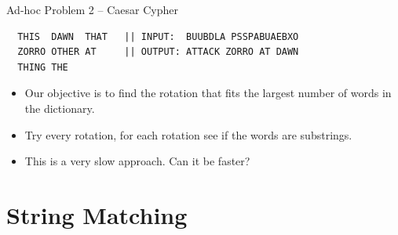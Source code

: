 \begin{frame}[fragile]{Ad-hoc Problem 2 -- Caesar Cypher}
\begin{verbatim}
  THIS  DAWN  THAT   || INPUT:  BUUBDLA PSSPABUAEBXO
  ZORRO OTHER AT     || OUTPUT: ATTACK ZORRO AT DAWN
  THING THE
\end{verbatim}

  \begin{itemize}
    \item Our objective is to find the rotation that fits the largest number of words in the dictionary.\bigskip

    \item Try every rotation, for each rotation see if the words are substrings.\bigskip

    \item This is a very slow approach. Can it be faster?
  \end{itemize}
\end{frame}

%
%
%
%


\section{String Matching} %
